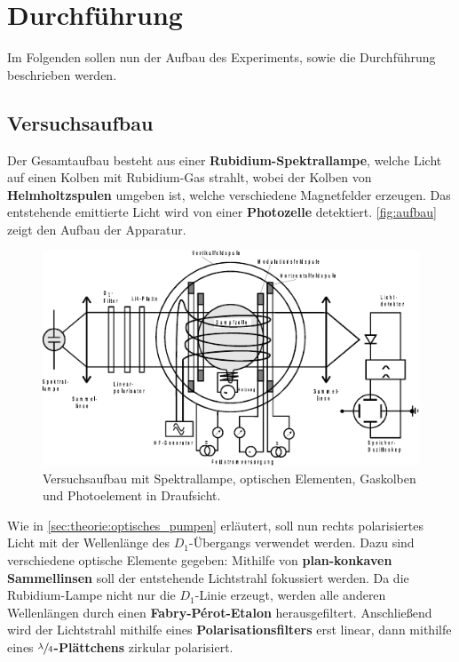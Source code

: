 \section{Durchführung}
\label{sec:durchfuehrung}

    Im Folgenden sollen nun der Aufbau des Experiments,
    sowie die Durchführung beschrieben werden.

\subsection{Versuchsaufbau}

    Der Gesamtaufbau besteht aus einer \textbf{Rubidium-Spektrallampe},
    welche Licht auf einen Kolben mit Rubidium-Gas strahlt,
    wobei der Kolben von \textbf{Helmholtzspulen} umgeben ist,
    welche verschiedene Magnetfelder erzeugen.
    Das entstehende emittierte Licht wird von einer \textbf{Photozelle} detektiert.
    \autoref{fig:aufbau} zeigt den Aufbau der Apparatur.
    \begin{figure}
        \centering
        \includegraphics[width=\textwidth]{content/img/Abb_1.pdf}
        \caption{Versuchsaufbau mit Spektrallampe, optischen Elementen, Gaskolben und Photoelement in Draufsicht. \cite{versuchsanleitung}}
        \label{fig:aufbau}
    \end{figure}

    Wie in \autoref{sec:theorie:optisches_pumpen} erläutert,
    soll nun rechts polarisiertes Licht mit der Wellenlänge des $D_1$-Übergangs verwendet werden.
    Dazu sind verschiedene optische Elemente gegeben:
    Mithilfe von \textbf{plan-konkaven Sammellinsen} soll der entstehende Lichtstrahl fokussiert werden.
    Da die Rubidium-Lampe nicht nur die $D_1$-Linie erzeugt,
    werden alle anderen Wellenlängen durch einen \textbf{Fabry-Pérot-Etalon} herausgefiltert.
    Anschließend wird der Lichtstrahl mithilfe eines \textbf{Polarisationsfilters} erst linear,
    dann mithilfe eines \textbf{$\sfrac{\lambda}{4}$-Plättchens} zirkular polarisiert.

